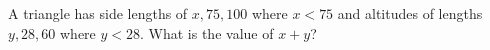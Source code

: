 A triangle has side lengths of $x,75,100$ where $x<75$ and altitudes of lengths $y,28,60$ where $y<28$. What is the value of $x+y$?